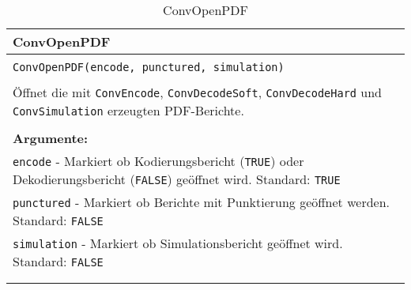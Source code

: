\begin{longtable}{|p{\textwidth}|}
\hline
\rowcolor{lightblue}
ConvOpenPDF
\\
\hline
\\
\texttt{ConvOpenPDF(encode, punctured, simulation)}\\
\\
Öffnet die mit \texttt{ConvEncode}, \texttt{ConvDecodeSoft}, \texttt{ConvDecodeHard} und \texttt{ConvSimulation} erzeugten PDF-Berichte.\\
\\
\textbf{Argumente:}\\
\texttt{encode} - Markiert ob Kodierungsbericht (\texttt{TRUE}) oder Dekodierungsbericht (\texttt{FALSE}) geöffnet wird. Standard: \texttt{TRUE}\\
\texttt{punctured} - Markiert ob Berichte mit Punktierung geöffnet werden. Standard: \texttt{FALSE}\\
\texttt{simulation} - Markiert ob Simulationsbericht geöffnet wird. Standard: \texttt{FALSE}\\
\\
\hline
\caption{ConvOpenPDF}
\end{longtable}